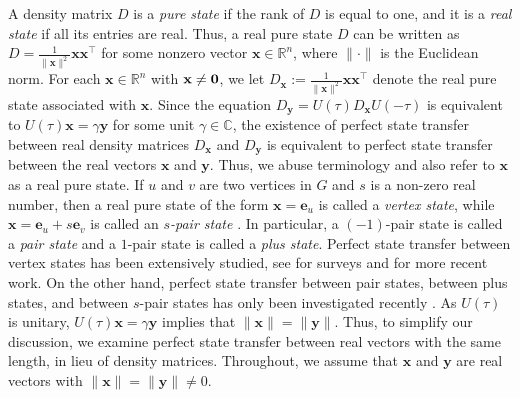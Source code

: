 \documentclass[11pt]{article}
\newcommand{\zero}{{\bf{0}}}
\newcommand{\be}{\mathbf e}
\newcommand{\bx}{\mathbf x}
\newcommand{\by}{\mathbf y}
\def\C{\mathbb{C}}
\def\R{\mathbb{R}}
\begin{document}
A density matrix $D$ is a \textit{pure state} if the rank of $D$ is equal to one, and it is a \textit{real state} if all its entries are real. Thus, a real pure state $D$ can be written as $D=\frac{1}{\|\bx\|^2}\bx\bx^\top$ for some nonzero vector $\bx\in\R^n$, where $\|\cdot\|$ is the Euclidean norm. For each $\bx\in\R^n$ with $\bx\neq \zero$, we let $D_{\bx}:=\frac{1}{\|\bx\|^2}\bx\bx^\top$ denote the real pure state associated with $\bx$. Since the equation $D_{\by}=U(\tau)D_{\bx}U(-\tau)$ is equivalent to $U(\tau)\bx=\gamma\by$ for some unit $\gamma\in\C$, the existence of perfect state transfer between real density matrices $D_{\bx}$ and $D_{\by}$ is equivalent to perfect state transfer between the real vectors $\bx$ and $\by$. Thus, we abuse terminology and also refer to $\bx$ as a real pure state. If $u$ and $v$ are two vertices in $G$ and $s$ is a non-zero real number, then a real pure state of the form $\bx=\be_u$ is called a \textit{vertex state}, while $\bx=\be_u+s\be_v$ is called an \textit{$s$-pair state} \cite{kim2024generalization}. In particular, a $(-1)$-pair state is called a \textit{pair state} and a $1$-pair state is called a \textit{plus state}. Perfect state transfer between vertex states has been extensively studied, see \cite{christandl2004,Coutinho2014,godsil2012state,kay2010perfect,kendon2011perfect} for surveys and \cite{soffia2022state,bhattacharjya2024quantum,coutinho2024no} for more recent work. On the other hand, perfect state transfer between pair states, between plus states, and between $s$-pair states has only been investigated recently \cite{bernard2025quantum,Chen2020PairST,kim2024generalization,pal2024quantum}. As $U(\tau)$ is unitary, $U(\tau)\bx=\gamma\by$ implies that $\|\bx\|=\|\by\|$. Thus, to simplify our discussion, we examine perfect state transfer between real vectors with the same length, in lieu of density matrices. Throughout, we assume that $\bx$ and $\by$ are real vectors with $\|\bx\|=\|\by\|\neq 0$. 
\end{document}
